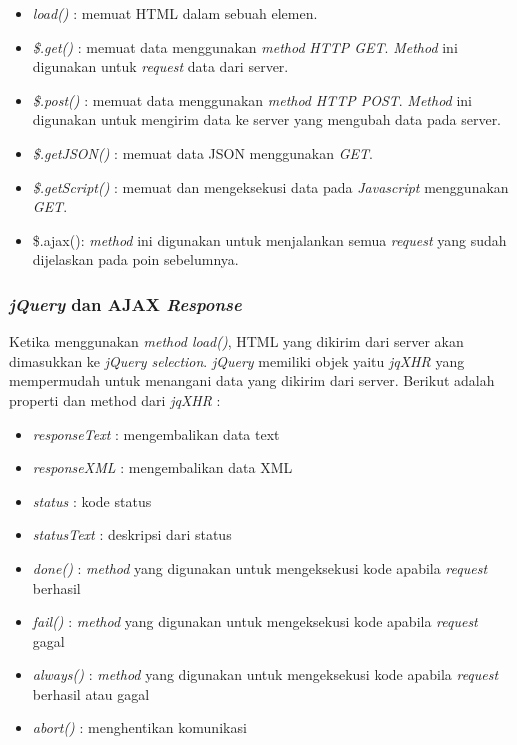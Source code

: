 \begin{itemize}
	\item \textit{load()} : memuat HTML dalam sebuah elemen.
	\item \textit{\$.get()} : memuat data menggunakan \textit{method} \textit{HTTP GET}. \textit{Method} ini digunakan untuk \textit{request} data dari server.
	\item \textit{\$.post()} : memuat data menggunakan \textit{method} \textit{HTTP POST}. \textit{Method} ini digunakan untuk mengirim data ke server yang mengubah data pada server.
	\item \textit{\$.getJSON()} : memuat data JSON menggunakan \textit{GET}. 
	\item \textit{\$.getScript()} : memuat dan mengeksekusi data pada \textit{Javascript} menggunakan \textit{GET}.
	\item \$.ajax(): \textit{method} ini digunakan untuk menjalankan semua \textit{request} yang sudah dijelaskan pada poin sebelumnya. 
\end{itemize}

\subsubsection{\textit{jQuery} dan AJAX \textit{Response}}
Ketika menggunakan \textit{method load()}, HTML yang dikirim dari server akan dimasukkan ke \textit{jQuery selection}. \textit{jQuery} memiliki objek yaitu \textit{jqXHR} yang mempermudah untuk menangani data yang dikirim dari server. Berikut adalah properti dan method dari \textit{jqXHR} :

\begin{itemize}
	\item \textit{responseText} : mengembalikan data text
	\item \textit{responseXML} : mengembalikan data XML
	\item \textit{status} : kode status
	\item \textit{statusText} : deskripsi dari status
	\item \textit{done()} : \textit{method} yang digunakan untuk mengeksekusi kode apabila \textit{request} berhasil
	\item \textit{fail()} : \textit{method} yang digunakan untuk mengeksekusi kode apabila \textit{request} gagal
	\item \textit{always()} : \textit{method} yang digunakan untuk mengeksekusi kode apabila \textit{request} berhasil atau gagal
	\item \textit{abort()} : menghentikan komunikasi
\end{itemize} 

